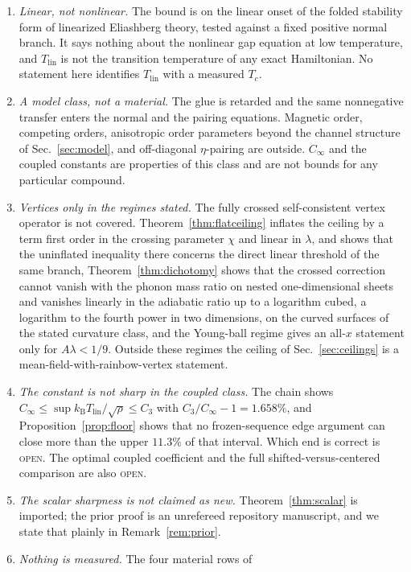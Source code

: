 \documentclass[aps,10pt,superscriptaddress,floatfix,amsmath,amssymb,nofootinbib]{revtex4-2}
\newcommand{\kb}{k_{\mathrm B}}
\newcommand{\Tlin}{T_{\mathrm{lin}}}
\newcommand{\Cinf}{C_\infty}
\newcommand{\Cthree}{C_{3}}
\newcommand{\OPEN}{\textsc{open}}
\begin{document}
\begin{enumerate}
\item[\rm 1.] \emph{Linear, not nonlinear.} The bound is on the linear onset of the folded
stability form of linearized Eliashberg theory, tested against a fixed positive normal
branch. It says nothing about the nonlinear gap equation at low temperature, and $\Tlin$ is
not the transition temperature of any exact Hamiltonian. No statement here identifies
$\Tlin$ with a measured $T_c$.
\item[\rm 2.] \emph{A model class, not a material.} The glue is retarded and the same
nonnegative transfer enters the normal and the pairing equations. Magnetic order, competing
orders, anisotropic order parameters beyond the channel structure of
Sec.~\ref{sec:model}, and off-diagonal $\eta$-pairing are outside. $\Cinf$ and the coupled
constants are properties of this class and are not bounds for any particular compound.
\item[\rm 3.] \emph{Vertices only in the regimes stated.} The fully crossed self-consistent
vertex operator is not covered. Theorem~\ref{thm:flatceiling} inflates the ceiling by a
term first order in the crossing parameter $\chi$ and linear in $\lambda$, and shows that
the uninflated inequality there concerns the direct linear threshold of the same branch,
Theorem~\ref{thm:dichotomy} shows that the crossed correction cannot vanish with the phonon
mass ratio on nested one-dimensional sheets and vanishes linearly in the adiabatic ratio up
to a logarithm cubed, a logarithm to the fourth power in two dimensions, on the curved
surfaces of the stated curvature class, and the Young-ball regime gives an
all-$x$ statement only for
$A\lambda<1/9$. Outside these regimes the ceiling of Sec.~\ref{sec:ceilings} is a
mean-field-with-rainbow-vertex statement.
\item[\rm 4.] \emph{The constant is not sharp in the coupled class.} The chain shows
$\Cinf\le\sup\kb\Tlin/\sqrt\rho\le\Cthree$ with $\Cthree/\Cinf-1=1.658\%$, and
Proposition~\ref{prop:floor} shows that no frozen-sequence edge argument can close more than
the upper $11.3\%$ of that interval. Which end is correct is \OPEN{}. The optimal coupled
coefficient and the full shifted-versus-centered comparison are also \OPEN{}.
\item[\rm 5.] \emph{The scalar sharpness is not claimed as new.} Theorem~\ref{thm:scalar}
is imported; the prior proof is an unrefereed repository manuscript, and we state that
plainly in Remark~\ref{rem:prior}.
\item[\rm 6.] \emph{Nothing is measured.} The four material rows of

\end{enumerate}
\end{document}
